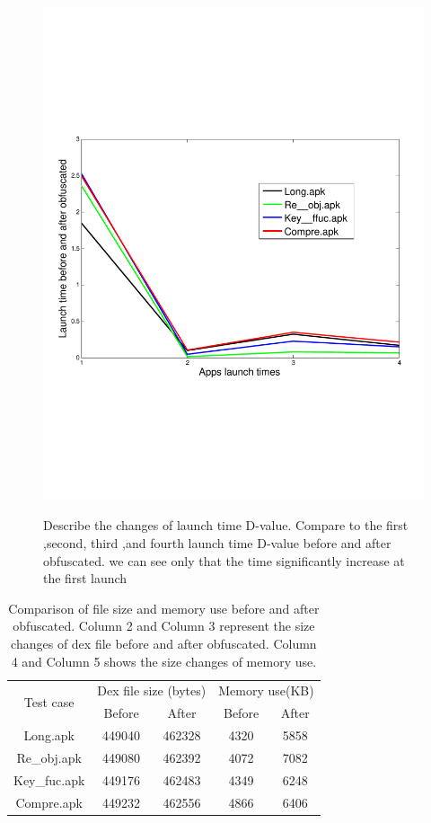 \begin{figure}
  \centering
  \includegraphics[width=0.8\columnwidth]{fig/fig8.pdf}\\
  \caption{Describe the changes of launch time D-value. Compare to the first ,second, third ,and fourth launch time D-value before and after obfuscated. we can see only that the time significantly increase at the first launch  }\label{fig:Figure 8}
\end{figure}


\begin{table}[htbp]
  \centering
  \begin{tabular}{c c c c c}
  \toprule
  \multirow{2}{*}{Test case} & \multicolumn{2}{c}{Dex file size (bytes)} & \multicolumn{2}{c}{Memory use(KB)}\\
  \cline{2-5}
  \cmidrule{2-5}

  & Before & After &  Before & After\\
  \hline

  Long.apk & 449040 & 462328 & 4320 & 5858\\
   \rowcolor{mygray}


  Re\_obj.apk & 449080 & 462392 & 4072 & 7082\\


  Key\_fuc.apk & 449176 & 462483 & 4349 & 6248\\

\rowcolor{mygray}
  Compre.apk & 449232 & 462556 & 4866 & 6406\\
  \bottomrule
  \end{tabular}
  \caption{Comparison of file size and memory use before and after obfuscated. Column 2 and Column 3 represent the size changes of dex file before and after obfuscated. Column 4 and Column 5 shows the size changes of memory use.}\label{tab:Table 3}
\end{table}

